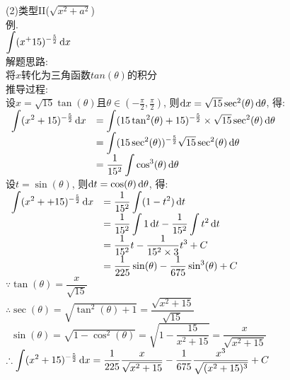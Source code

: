 (2)类型II($\sqrt{x^2+a^2}$)\\
例.\\
$\displaystyle\int(x^+15)^{-\frac{5}{2}}\mathop{}\!\mathrm{d} x$\\
解题思路:\\
将$x$转化为三角函数$tan(\theta)$的积分\\
推导过程:\\
设$x=\sqrt{15}\tan(\theta)$且$\theta\in(-\frac{\pi}{2},\frac{\pi}{2})$, 则$\mathop{}\!\mathrm{d} x=\sqrt{15}\sec^2(\theta)\mathop{}\!\mathrm{d}\theta$, 得:\\
$\begin{array}{>{\displaystyle}r >{\displaystyle}l}
\int(x^2+15)^{-\frac{5}{2}}\dif x & =\int(15\tan^2(\theta)+15)^{-\frac{5}{2}}\times\sqrt{15}\sec^2(\theta)\dif\theta\\
& =\int(15\sec^2(\theta))^{-\frac{5}{2}}\sqrt{15}\sec^2(\theta)\dif\theta\\
& =\frac{1}{15^2}\int\cos^3(\theta)\dif\theta
\end{array}$\\[1ex]
设$t=\sin(\theta)$, 则$\mathop{}\!\mathrm{d} t=\cos(\theta)\mathop{}\!\mathrm{d}\theta$, 得:\\[1ex]
$\begin{array}{>{\displaystyle}r >{\displaystyle}l}
\int(x^2++15)^{-\frac{5}{2}}\dif x & =\frac{1}{15^2}\int(1-t^2)\dif t\\[1ex]
& =\frac{1}{15^2}\int 1\dif t-\frac{1}{15^2}\int t^2\dif t\\[1ex]
& =\frac{1}{15^2}t-\frac{1}{15^2\times 3}t^3+C\\[1ex]
& =\frac{1}{225}\sin(\theta)-\frac{1}{675}\sin^3(\theta)+C
\end{array}$\\
$\because\tan(\theta)=\dfrac{x}{\sqrt{15}}$\\
$\therefore\sec(\theta)=\sqrt{\tan^2(\theta)+1}=\dfrac{\sqrt{x^2+15}}{\sqrt{15}}$\\
$\phantom{\therefore}\sin(\theta)=\sqrt{1-\cos^2(\theta)}=\sqrt{1-\dfrac{15}{x^2+15}}=\dfrac{x}{\sqrt{x^2+15}}$\\
$\displaystyle\therefore\int(x^2+15)^{-\frac{5}{2}}\mathop{}\!\mathrm{d} x=\frac{1}{225}\frac{x}{\sqrt{x^2+15}}-\frac{1}{675}\frac{x^3}{\sqrt{(x^2+15)^3}}+C$\\[2ex]

